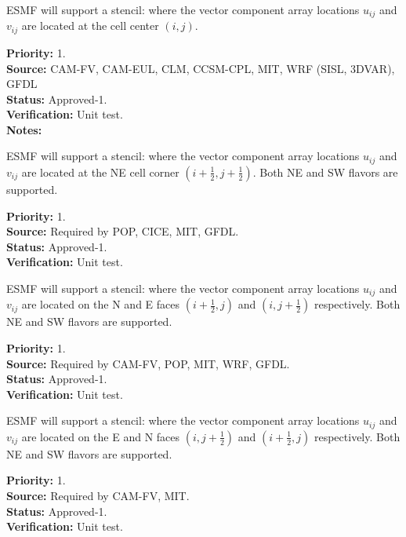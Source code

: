 \sreq{\agrid}

ESMF will support a \agrid stencil: where the vector
component array locations $u_{ij}$ and $v_{ij}$ are located at the
cell center $(i,j)$.

\begin{reqlist}
{\bf Priority:} 1. \\ 
{\bf Source:} CAM-FV, CAM-EUL, CLM, CCSM-CPL, MIT, WRF (SISL, 3DVAR), GFDL \\
{\bf Status:} Approved-1. \\
{\bf Verification:} Unit test. \\
{\bf Notes:}
\end{reqlist}

\sreq{\bgrid}

ESMF will support a \bgrid stencil: where the vector component array
locations $u_{ij}$ and $v_{ij}$ are located at the NE cell corner
$(i+\frac12,j+\frac12)$. Both NE and SW flavors are supported.

\begin{reqlist}
{\bf Priority:} 1.\\ 
{\bf Source:} Required by POP, CICE, MIT, GFDL. \\
{\bf Status:} Approved-1. \\
{\bf Verification:} Unit test.
\end{reqlist}

\sreq{\cgrid}

ESMF will support a \cgrid stencil: where the vector component array
locations $u_{ij}$ and $v_{ij}$ are located on the N and E faces
$(i+\frac12,j)$ and $(i,j+\frac12)$ respectively. Both NE and SW
flavors are supported.

\begin{reqlist}
{\bf Priority:} 1. \\ 
{\bf Source:} Required by CAM-FV, POP, MIT, WRF, GFDL. \\
{\bf Status:} Approved-1. \\
{\bf Verification:} Unit test.
\end{reqlist}

\sreq{\dgrid}

ESMF will support a \dgrid stencil: where the vector component array
locations $u_{ij}$ and $v_{ij}$ are located on the E and N faces
$(i,j+\frac12)$ and $(i+\frac12,j)$ respectively. Both NE and SW
flavors are supported.

\begin{reqlist}
{\bf Priority:} 1. \\ 
{\bf Source:} Required by CAM-FV, MIT. \\
{\bf Status:} Approved-1. \\
{\bf Verification:} Unit test.
\end{reqlist}


